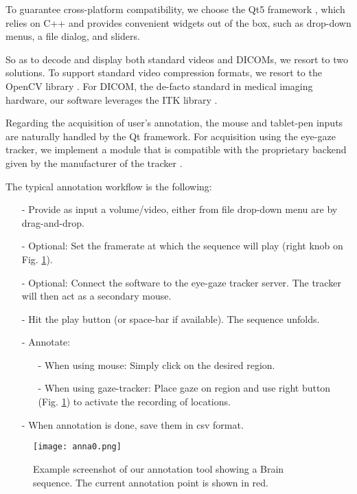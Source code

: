 To guarantee cross-platform compatibility, we choose the Qt5 framework \cite{eng16}, which relies on C++ and provides convenient widgets out of the box, such as drop-down menus, a file dialog, and sliders.

So as to decode and display both standard videos and DICOMs, we resort to two solutions.
To support standard video compression formats, we resort to the OpenCV library \cite{opencv}.
For DICOM, the de-facto standard in medical imaging hardware, our software leverages the ITK library \cite{johnson15}.

Regarding the acquisition of user's annotation, the mouse and tablet-pen inputs are naturally handled by the Qt framework.
For acquisition using the eye-gaze tracker, we implement a module that is compatible with the proprietary backend given by the manufacturer of the tracker \cite{eyetribe}.

The typical annotation workflow is the following:

\begin{itemize}
  \item[-]{Provide as input a volume/video, either from file drop-down menu are by drag-and-drop.}
  \item[-]{Optional: Set the framerate at which the sequence will play (right knob on Fig. \ref{fig:anna}).}
  \item[-]{Optional: Connect the software to the eye-gaze tracker server. The tracker will then act as a secondary mouse.}
  \item[-]{Hit the play button (or space-bar if available). The sequence unfolds.}
  \item[-]{Annotate:}
    \begin{itemize}
      \item[-]{When using mouse: Simply click on the desired region.}
      \item[-]{When using gaze-tracker: Place gaze on region and use right button (Fig. \ref{fig:anna}) to activate the recording of locations.}
    \end{itemize}
  \item[-]{When annotation is done, save them in \gls{csv} format.}
\end{itemize}

\begin{figure}[!htpb]
  \texttt{[image: anna0.png]}
  \caption{Example screenshot of our annotation tool showing a Brain sequence.
  The current annotation point is shown in red.}
  \label{fig:anna}
\end{figure}

